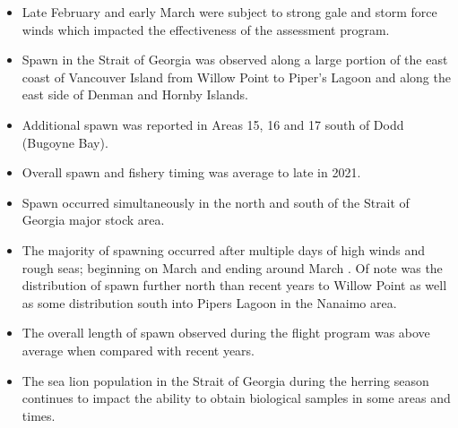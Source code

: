 \begin{itemize}
\item Late February and early March were subject to strong gale and storm force winds
which impacted the effectiveness of the assessment program.
\item Spawn in the Strait of Georgia was observed along a large portion
of the east coast of Vancouver Island from Willow Point to Piper's Lagoon and
along the east side of Denman and Hornby Islands.
\item Additional spawn was reported in Areas 15, 16 and 17 south of Dodd (Bugoyne Bay).
\item Overall spawn and fishery timing was average to late in 2021.
\item Spawn occurred simultaneously in the north and south of the Strait of Georgia major stock area.
\item The majority of spawning occurred after multiple days of high winds and rough seas;
beginning on March  and ending around March .
Of note was the distribution of spawn further north than recent years to Willow Point
as well as some distribution south into Pipers Lagoon in the Nanaimo area.
\item The overall length of spawn observed during the flight program was
above average when compared with recent years.
\item The sea lion population in the Strait of Georgia during the herring season
continues to impact the ability to obtain biological samples in some areas and times.
\end{itemize}
